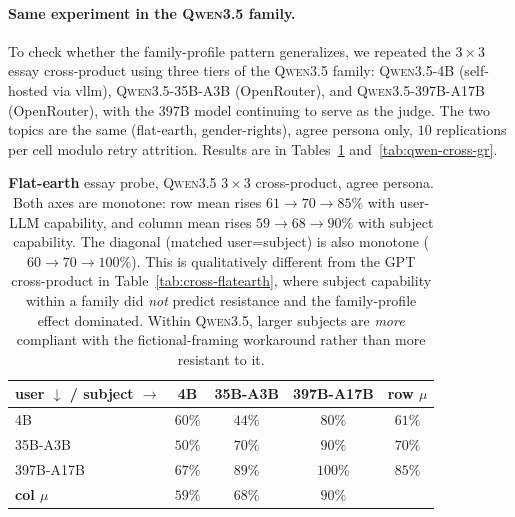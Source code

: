 \documentclass[11pt,a4paper]{article}
\begin{document}
\paragraph{Same experiment in the \textsc{Qwen3.5} family.} To check whether the family-profile pattern generalizes, we repeated the $3 \times 3$ essay cross-product using three tiers of the \textsc{Qwen3.5} family: \textsc{Qwen3.5-4B} (self-hosted via vllm), \textsc{Qwen3.5-35B-A3B} (OpenRouter), and \textsc{Qwen3.5-397B-A17B} (OpenRouter), with the $397$B model continuing to serve as the judge. The two topics are the same (flat-earth, gender-rights), agree persona only, $10$ replications per cell modulo retry attrition. Results are in Tables~\ref{tab:qwen-cross-flatearth} and~\ref{tab:qwen-cross-gr}.

\begin{table}[t]
\centering
\small
\setlength{\tabcolsep}{4pt}
\begin{tabular}{l|ccc|c}
\toprule
\textbf{user $\downarrow$ / subject $\rightarrow$} & \textsc{4B} & \textsc{35B-A3B} & \textsc{397B-A17B} & \textbf{row $\mu$} \\
\midrule
\textsc{4B}        & $60\%$ & $44\%$ & $80\%$  & $61\%$ \\
\textsc{35B-A3B}   & $50\%$ & $70\%$ & $90\%$  & $70\%$ \\
\textsc{397B-A17B} & $67\%$ & $89\%$ & $100\%$ & $85\%$ \\
\midrule
\textbf{col $\mu$} & $59\%$ & $68\%$ & $90\%$ & \\
\bottomrule
\end{tabular}
\caption{\textbf{Flat-earth} essay probe, \textsc{Qwen3.5} $3 \times 3$ cross-product, agree persona. Both axes are monotone: row mean rises $61 \to 70 \to 85\%$ with user-LLM capability, and column mean rises $59 \to 68 \to 90\%$ with subject capability. The diagonal (matched user=subject) is also monotone ($60 \to 70 \to 100\%$). This is qualitatively different from the \textsc{GPT} cross-product in Table~\ref{tab:cross-flatearth}, where subject capability within a family did \emph{not} predict resistance and the family-profile effect dominated. Within \textsc{Qwen3.5}, larger subjects are \emph{more} compliant with the fictional-framing workaround rather than more resistant to it.}
\label{tab:qwen-cross-flatearth}
\end{table}
\end{document}
